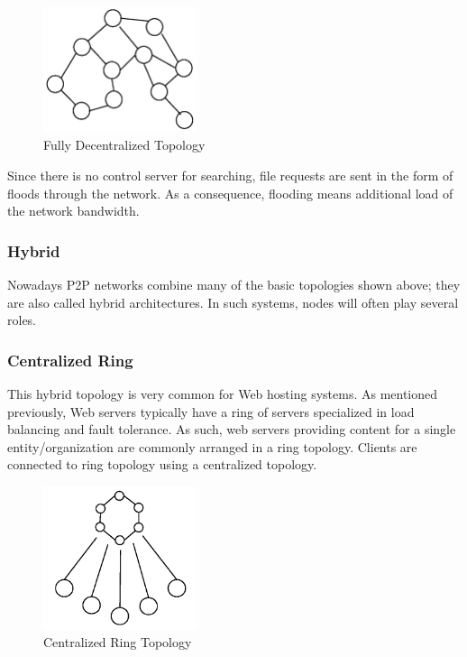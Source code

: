 \begin{figure}
  \centering
  \includegraphics[width=0.4\textwidth]{src/img/p2p-systems/decentralized}
  \caption{Fully Decentralized Topology}
  \label{fig:p2p-systems:decentralized}
\end{figure}

Since there is no control server for searching, file requests are sent in the
form of floods through the network. As a consequence, flooding means additional
load of the network bandwidth.

\subsubsection{Hybrid}

Nowadays P2P networks combine many of the basic topologies shown above; they
are also called hybrid architectures. In such systems, nodes will often play
several roles.

\subsubsection{Centralized Ring}

This hybrid topology is very common for Web hosting systems. As mentioned
previously, Web servers typically have a ring of servers specialized in load
balancing and fault tolerance. As such, web servers providing content for a
single entity/organization are commonly arranged in a ring topology.  Clients
are connected to ring topology using a centralized topology.

\begin{figure}
  \centering
  \includegraphics[width=0.4\textwidth]{src/img/p2p-systems/centralized-ring}
  \caption{Centralized Ring Topology}
  \label{fig:p2p-systems:centralized-ring}
\end{figure}

